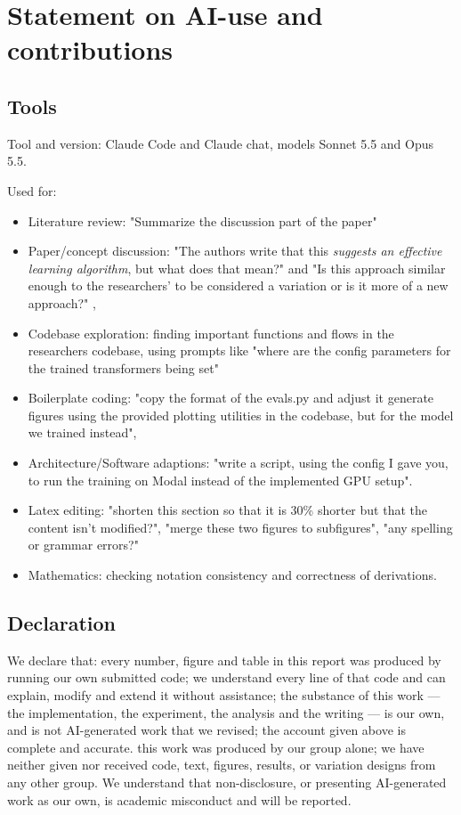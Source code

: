 \newpage
\section*{Statement on AI-use and contributions}

\subsection*{Tools}

Tool and version: Claude Code and Claude chat, models Sonnet 5.5 and Opus 5.5. 

Used for:

\begin{itemize}
    \item Literature review: "Summarize the discussion part of the paper"
    \item Paper/concept discussion: "The authors write that this \textit{suggests an effective learning algorithm}, but what does that mean?" and "Is this approach similar enough to the researchers' to be considered a variation or is it more of a new approach?" , 
    \item Codebase exploration: finding important functions and flows in the researchers codebase, using prompts like "where are the config parameters for the trained transformers being set"
    \item Boilerplate coding: "copy the format of the evals.py and adjust it generate figures using the provided plotting utilities in the codebase, but for the model we trained instead", 
    \item Architecture/Software adaptions: "write a script, using the config I gave you, to run the training on Modal instead of the implemented GPU setup". 
    \item Latex editing: "shorten this section so that it is 30\% shorter but that the content isn't modified?", "merge these two figures to subfigures", "any spelling or grammar errors?"
    \item Mathematics: checking notation consistency and correctness of derivations.
\end{itemize}

\subsection*{Declaration} 

We declare that:
every number, figure and table in this report was produced by running our own submitted code;
we understand every line of that code and can explain, modify and extend it without assistance;
the substance of this work — the implementation, the experiment, the analysis and the writing — is our own, and is not AI-generated work that we revised;
the account given above is complete and accurate.
this work was produced by our group alone; we have neither given nor received code, text, figures, results, or variation designs from any other group.
We understand that non-disclosure, or presenting AI-generated work as our own, is academic misconduct and will be reported.

